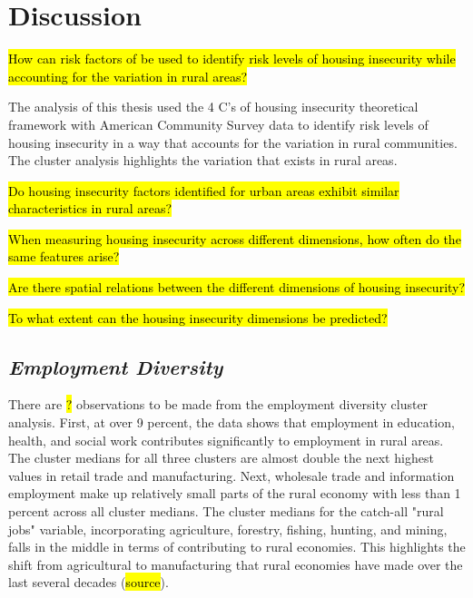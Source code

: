 \chapter{Discussion}	

\hl{How can risk factors of be used to identify risk levels of housing insecurity while accounting for the variation in rural areas?}

The analysis of this thesis used the 4 C's of housing insecurity theoretical framework with American Community Survey data to identify risk levels of housing insecurity in a way that accounts for the variation in rural communities. The cluster analysis highlights the variation that exists in rural areas.

\hl{Do housing insecurity factors identified for urban areas exhibit similar characteristics in rural areas?}

\hl{When measuring housing insecurity across different dimensions, how often do the same features arise?}

\hl{Are there spatial relations between the different dimensions of housing insecurity?}

\hl{To what extent can the housing insecurity dimensions be predicted?}



\section{\textit{Employment Diversity}}

There are \hl{?} observations to be made from the employment diversity cluster analysis. First, at over 9 percent, the data shows that employment in education, health, and social work contributes significantly to employment in rural areas. The cluster medians for all three clusters are almost double the next highest values in retail trade and manufacturing. Next, wholesale trade and information employment make up relatively small parts of the rural economy with less than 1 percent across all cluster medians. The cluster medians for the catch-all "rural jobs" variable, incorporating agriculture, forestry, fishing, hunting, and mining, falls in the middle in terms of contributing to rural economies. This highlights the shift from agricultural to manufacturing that rural economies have made over the last several decades (\hl{source}). 

